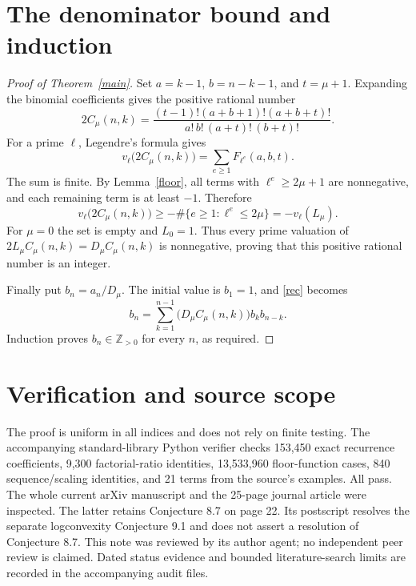 \documentclass[11pt]{article}
\begin{document}
\section*{The denominator bound and induction}
\begin{proof}[Proof of Theorem~\ref{main}]
Set $a=k-1$, $b=n-k-1$, and $t=\mu+1$. Expanding the binomial
coefficients gives the positive rational number
\begin{equation}\label{ratio}
 2C_\mu(n,k)=
 \frac{(t-1)!(a+b+1)!(a+b+t)!}
 {a!\,b!\,(a+t)!\,(b+t)!}.
\end{equation}
For a prime $\ell$, Legendre's formula gives
\[
 v_\ell\bigl(2C_\mu(n,k)\bigr)
 =\sum_{e\ge1} F_{\ell^e}(a,b,t).
\]
The sum is finite. By Lemma~\ref{floor}, all terms with
$\ell^e\ge2\mu+1$ are nonnegative, and each remaining term is at
least $-1$. Therefore
\[
 v_\ell\bigl(2C_\mu(n,k)\bigr)
 \ge-\#\{e\ge1:\ell^e\le2\mu\}
 =-v_\ell(L_\mu).
\]
For $\mu=0$ the set is empty and $L_0=1$. Thus every prime valuation
of $2L_\mu C_\mu(n,k)=D_\mu C_\mu(n,k)$ is nonnegative, proving
that this positive rational number is an integer.

Finally put $b_n=a_n/D_\mu$. The initial value is $b_1=1$, and
\eqref{rec} becomes
\[
 b_n=\sum_{k=1}^{n-1}
 \bigl(D_\mu C_\mu(n,k)\bigr)b_kb_{n-k}.
\]
Induction proves $b_n\in\mathbb Z_{>0}$ for every $n$, as required.
\end{proof}

\section*{Verification and source scope}
The proof is uniform in all indices and does not rely on finite testing.
The accompanying standard-library Python verifier checks 153,450 exact
recurrence coefficients, 9,300 factorial-ratio identities, 13,533,960
floor-function cases, 840 sequence/scaling identities, and 21 terms from
the source's examples. All pass. The whole current arXiv manuscript and
the 25-page journal article were inspected. The latter retains Conjecture
8.7 on page 22. Its postscript resolves the separate logconvexity
Conjecture 9.1 and does not assert a resolution of Conjecture 8.7.
This note was reviewed by its author agent; no independent peer review
is claimed. Dated status evidence and bounded literature-search limits
are recorded in the accompanying audit files.
\end{document}
